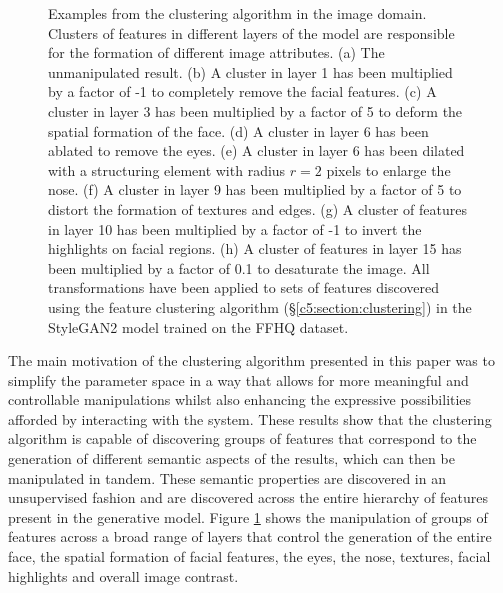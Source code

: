 \begin{figure}[!htbp]
        \hfill
        \hfill
       \caption[A comparison of different transforms being applied to different clusters in various layers of StyleGAN2]{Examples from the clustering algorithm in the image domain. Clusters  of features in different layers of the model are responsible for the formation of different image attributes. (a) The unmanipulated result. (b) A cluster in layer 1 has been multiplied by a factor of -1 to completely remove the facial features. (c) A cluster in layer 3 has been multiplied by a factor of 5 to deform the spatial formation of the face. (d) A cluster in layer 6 has been ablated to remove the eyes. (e) A cluster in layer 6 has been dilated with a structuring element with radius $r=2$ pixels to enlarge the nose. (f) A cluster in layer 9 has been multiplied by a factor of 5 to distort the formation of textures and edges. (g) A cluster of features in layer 10 has been multiplied by a factor of -1 to invert the highlights on facial regions. (h) A cluster of features in layer 15 has been multiplied by a factor of 0.1 to desaturate the image. All transformations have been applied to sets of features discovered using the feature clustering algorithm (\S\ref{c5:section:clustering}) in the StyleGAN2 model trained on the FFHQ dataset.}
       \label{fig:c5:cluster_layer_comp_image}
    \end{figure}

The main motivation of the clustering algorithm presented in this paper was to simplify the parameter space in a way that allows for more meaningful and controllable manipulations whilst also enhancing the expressive possibilities afforded by interacting with the system. 
These results show that the clustering algorithm is capable of discovering groups of features that correspond to the generation of different semantic aspects of the results, which can then be manipulated in tandem. 
These semantic properties are discovered in an unsupervised fashion and are discovered across the entire hierarchy of features present in the generative model. 
Figure \ref{fig:c5:cluster_layer_comp_image} shows the manipulation of groups of features across a broad range of layers that control the generation of the entire face, the spatial formation of facial features, the eyes, the nose, textures, facial highlights and overall image contrast.

